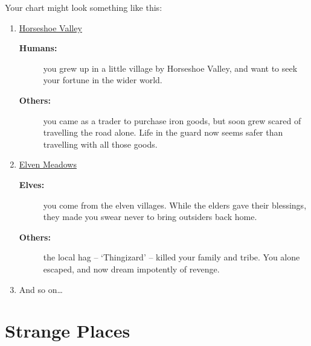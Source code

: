 \begin{multicols}{2}
\needspace{8em}
Your chart might look something like this:
\begin{enumerate}
  \item
  \underline{Horseshoe Valley}
  \begin{description}
    \item[\textbf{Humans:}] you grew up in a little village by Horseshoe Valley, and want to seek your fortune in the wider world.
    \item[\textbf{Others:}] you came as a trader to purchase iron goods, but soon grew scared of travelling the road alone.
    Life in the \gls{guard} now seems safer than travelling with all those goods.
  \end{description}
  \item
  \underline{Elven Meadows}
  \begin{description}
    \item[\textbf{Elves:}]
    you come from the elven villages.
    While the elders gave their blessings, they made you swear never to bring outsiders back home.
    \item[\textbf{Others:}]
    the local hag -- `Thingizard' -- killed your family and tribe.
    You alone escaped, and now dream impotently of revenge.
  \end{description}
  \item
  And so on\ldots
\end{enumerate}

\end{multicols}

\section{Strange Places}

